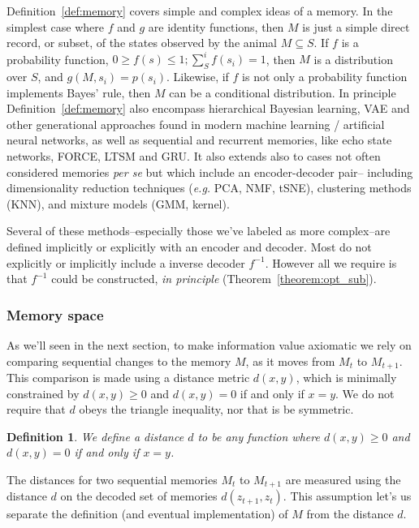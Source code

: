\documentclass[9pt,twocolumn,twoside]{pnas-new}
\newtheorem{definition}{Definition}
\begin{document}
Definition~\ref{def:memory} covers simple and complex ideas of a memory. In the simplest case where $f$ and $g$ are identity functions, then $M$ is just a simple direct record, or subset, of the states observed by the animal $M \subseteq S$. If $f$ is a probability function, $0 \geq f(s) \leq 1; \sum_{S}^{i} f(s_i) = 1$, then $M$ is a distribution over $S$, and $g(M, s_i) = p(s_i)$. Likewise, if $f$ is not only a probability function implements Bayes' rule, then $M$ can be a conditional distribution. In principle Definition~\ref{def:memory} also encompass hierarchical Bayesian learning, VAE and other generational approaches found in modern machine learning / artificial neural networks, as well as sequential and recurrent memories, like echo state networks, FORCE, LTSM and GRU. It also extends also to cases not often considered memories \textit{per se} but which include an encoder-decoder pair-- including dimensionality reduction techniques (\textit{e.g.} PCA, NMF, tSNE), clustering methods (KNN), and mixture models (GMM, kernel).

Several of these methods--especially those we've labeled as more complex--are defined implicitly or explicitly with an encoder and decoder. Most do not explicitly or implicitly include a inverse decoder $f^{-1}$. However all we require is that $f^{-1}$ could be constructed, \textit{in principle} (Theorem~\ref{theorem:opt_sub}).

\subsubsection*{Memory space}
As we'll seen in the next section, to make information value axiomatic we rely on comparing sequential changes to the memory $M$, as it moves from $M_{t}$ to $M_{t+1}$. This comparison is made using a distance metric $d(x,y)$, which is minimally constrained by $d(x,y) \geq 0$ and $d(x,y) = 0$ if and only if $x = y$. We do not require that $d$ obeys the triangle inequality, nor that is be symmetric. 

\begin{definition}
\label{def:distance}
We define a distance $d$ to be any function where $d(x,y) \geq 0$ and $d(x,y) = 0$ if and only if $x = y$.
\end{definition}

The distances for two sequential memories $M_{t}$ to $M_{t+1}$ are measured using the distance $d$ on the decoded set of memories $d(z_{t+1},z_{t})$. This assumption let's us separate the definition (and eventual implementation) of $M$ from the distance $d$.
\end{document}
